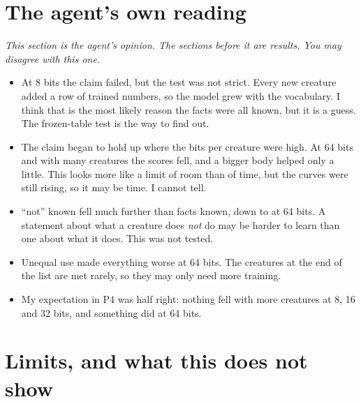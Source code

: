 

\section{The agent's own reading}\label{sec:reading}

\emph{This section is the agent's opinion. The sections before it are results. You may disagree with this one.}

\begin{itemize}
\item At 8 bits the claim failed, but the test was not strict. Every new creature added a row of
   trained numbers, so the model grew with the vocabulary. I think that is the most
  likely reason the facts were all known, but it is a guess. The frozen-table test is the way to find out.
\item The claim began to hold up where the bits per creature were high. At 64 bits and with many
  creatures the scores fell, and a bigger body helped only a little. This looks more like a limit of
  room than of time, but the curves were still rising, so it may be time. I cannot tell.
\item ``not'' known fell much further than facts known, down to  at 64 bits.
  A statement about what a creature does \emph{not} do may be harder to learn than one about what it
  does. This was not tested.
\item Unequal use made everything worse at 64 bits. The creatures at the end of the list are met
  rarely, so they may only need more training.
\item My expectation in P4 was half right: nothing fell with more creatures at 8, 16 and 32 bits,
  and something did at 64 bits.
\end{itemize}

\section{Limits, and what this does not show}\label{sec:limits}

